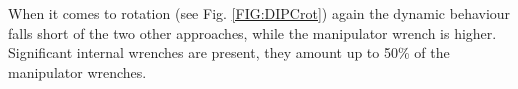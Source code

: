 \documentclass[a4paper,twoside, openright,12pt]{report}
\begin{document}

When it comes to rotation (see Fig. \ref{FIG:DIPCrot}) again the dynamic behaviour falls short of the two other approaches, while the manipulator wrench is higher. Significant internal wrenches are present, they amount up to 50\% of the manipulator wrenches.
\end{document}
